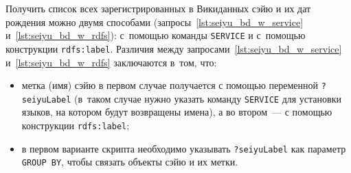 \newpage
{}
Получить список всех зарегистрированных в Викиданных сэйю и их дат рождения 
можно двумя способами (запросы~\ref{lst:seiyu_bd_w_service} и~\ref{lst:seiyu_bd_w_rdfs}): 
с~помощью команды \lstinline|SERVICE| 
и с~помощью конструкции \mbox{\lstinline|rdfs:label|}. 
Различия между запросами~\ref{lst:seiyu_bd_w_service} и~\ref{lst:seiyu_bd_w_rdfs} заключаются в~том, что:
%
\begin{itemize}%
    \item метка (имя) сэйю в первом случае получается с помощью переменной \lstinline|?seiyuLabel| 
        (в~таком случае нужно указать команду \lstinline|SERVICE| для установки языков, на котором будут возвращены имена), 
        а во втором~--- с помощью конструкции \lstinline|rdfs:label|;
    \item в первом варианте скрипта необходимо указывать \lstinline|?seiyuLabel| 
        как параметр \lstinline|GROUP BY|, чтобы связать объекты сэйю и их метки.
\end{itemize}

